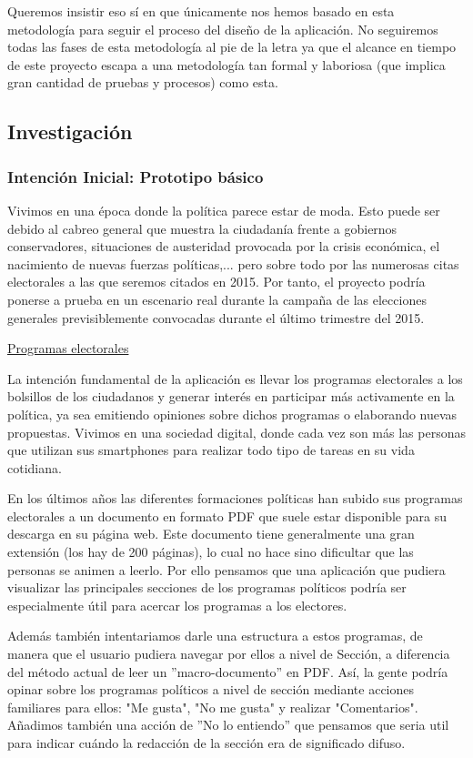 Queremos insistir eso sí en que únicamente nos hemos basado en esta metodología para seguir el proceso del diseño de la aplicación. No seguiremos todas las fases de esta metodología al pie de la letra ya que el alcance en tiempo de este proyecto escapa a una metodología tan formal y laboriosa (que implica gran cantidad de pruebas y procesos) como esta.

\subsection{Investigación}

\subsubsection{Intención Inicial: Prototipo básico}  

Vivimos en una época donde la política parece estar de moda. Esto puede ser debido al cabreo general que muestra la ciudadanía frente a gobiernos conservadores, situaciones de austeridad provocada por la crisis económica, el nacimiento de nuevas fuerzas políticas,... pero sobre todo por las numerosas citas electorales a las que seremos citados en 2015. Por tanto, el proyecto podría ponerse a prueba en un escenario real durante la campaña de las elecciones generales previsiblemente convocadas durante el último trimestre del 2015.

\underline{Programas electorales}

La intención fundamental de la aplicación es llevar los programas electorales a los bolsillos de los ciudadanos y generar interés en participar más activamente en la política, ya sea emitiendo opiniones sobre dichos programas o elaborando nuevas propuestas. Vivimos en una sociedad digital, donde cada vez son más las personas que utilizan sus smartphones para realizar todo tipo de tareas en su vida cotidiana.

En los últimos años las diferentes formaciones políticas han subido sus programas electorales a un documento en formato PDF que suele estar disponible para su descarga en su página web. Este documento tiene generalmente una gran extensión (los hay de 200 páginas), lo cual no hace sino dificultar que las personas se animen a leerlo. Por ello pensamos que una aplicación que pudiera visualizar las principales secciones de los programas políticos podría ser especialmente útil para acercar los programas a los electores.

Además también intentariamos darle una estructura a estos programas, de manera que el usuario pudiera navegar por ellos a nivel de Sección, a diferencia del método actual de leer un ''macro-documento'' en PDF. Así, la gente podría opinar sobre los programas políticos a nivel de sección mediante acciones familiares para ellos: "Me gusta", "No me gusta" y realizar "Comentarios". Añadimos también una acción de ''No lo entiendo'' que pensamos que seria util para indicar cuándo la redacción de la sección era de significado difuso.


